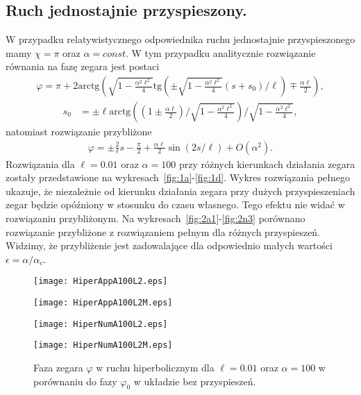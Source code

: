 \newpage
\subsection{Ruch jednostajnie przyspieszony.}
W przypadku relatywistycznego odpowiednika ruchu jednostajnie 
przyspieszonego mamy $\chi = \pi$ oraz $\alpha = const$.
W tym przypadku analitycznie rozwiązanie 
równania na fazę zegara jest postaci
\begin{align*}
\varphi = \pi + 
2\text{arctg} \left( 
\sqrt{1-\frac{\alpha^2\ell^2}{4}} 
\text{tg} \left( \pm 
\sqrt{1-\frac{\alpha^2\ell^2}{4}} 
(s + s_0)/\ell\right)  \mp \frac{\alpha \ell}{2}
\right),
\end{align*}
\begin{align*}
s_0 & = \pm \ell \text{arctg}  
\left( \left(1 \pm\frac{\alpha\ell}{2}\right) \Big / 
\sqrt{1-\frac{\alpha^2\ell^2}{4}}  \right)
\Big /\sqrt{1-\frac{\alpha^2\ell^2}{4}} ,
\end{align*}
natomiast rozwiązanie przybliżone 
\begin{align*}
\varphi =  \pm \frac{2}{\ell}s - \frac{\pi}{2} 
+ \frac{\alpha \ell}{2}  \sin (2 s / \ell  )  
+O(\alpha^2).
\end{align*}
Rozwiązania dla $\ell=0.01$ oraz $\alpha=100$ przy różnych 
kierunkach działania zegara 
zostały przedstawione na wykresach~\ref{fig:1a}-\ref{fig:1d}.
Wykres rozwiązania pełnego ukazuje, 
że niezależnie od kierunku działania zegara przy dużych 
przyspieszeniach zegar będzie opóźniony w stosunku do
czasu własnego. Tego efektu nie widać w rozwiązaniu przybliżonym.
Na wykresach~\ref{fig:2a1}-\ref{fig:2n3} porównano rozwiązanie
przybliżone z rozwiązaniem pełnym dla różnych przyspieszeń. 
Widzimy, że przybliżenie jest zadowalające dla odpowiednio małych 
wartości $\epsilon = \alpha / \alpha_c$.
\begin{figure}[h]
\begin{minipage}[b]{.5\linewidth}
\centering
\texttt{[image: HiperAppA100L2.eps]}
\label{fig:1a}
\end{minipage}%
\begin{minipage}[b]{.5\linewidth}
\centering
\texttt{[image: HiperAppA100L2M.eps]}
\label{fig:1b}
\end{minipage}
\begin{minipage}[b]{.5\linewidth}
\centering
\texttt{[image: HiperNumA100L2.eps]}
\label{fig:1c}
\end{minipage}%
\begin{minipage}[b]{.5\linewidth}
\centering
\texttt{[image: HiperNumA100L2M.eps]}
\label{fig:1d}
\end{minipage}
\caption{Faza zegara $\varphi$ w ruchu hiperbolicznym dla 
$\ell=0.01$ oraz $\alpha=100$ w porównaniu do fazy 
$\varphi_0$ w układzie bez przyspieszeń. }\label{fig:1}
\end{figure}


